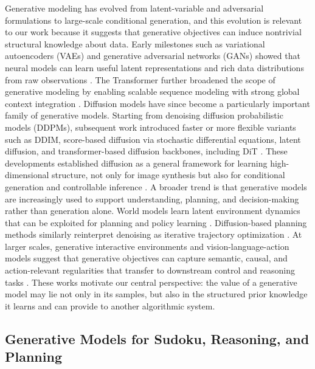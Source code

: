 \documentclass[lettersize,journal]{IEEEtran}
\begin{document}
Generative modeling has evolved from latent-variable and adversarial formulations to large-scale conditional generation, and this evolution is relevant to our work because it suggests that generative objectives can induce nontrivial structural knowledge about data.
Early milestones such as variational autoencoders (VAEs) and generative adversarial networks (GANs) showed that neural models can learn useful latent representations and rich data distributions from raw observations \cite{kingma2013autoencoding,goodfellow2014gan}.
The Transformer further broadened the scope of generative modeling by enabling scalable sequence modeling with strong global context integration \cite{vaswani2017attention}.
Diffusion models have since become a particularly important family of generative models.
Starting from denoising diffusion probabilistic models (DDPMs), subsequent work introduced faster or more flexible variants such as DDIM, score-based diffusion via stochastic differential equations, latent diffusion, and transformer-based diffusion backbones, including DiT \cite{ho2020ddpm,song2020ddim,song2021sde,rombach2022ldm,peebles2023dit}.
These developments established diffusion as a general framework for learning high-dimensional structure, not only for image synthesis but also for conditional generation and controllable inference \cite{han2024ada,han2024mmid}.
A broader trend is that generative models are increasingly used to support understanding, planning, and decision-making rather than generation alone.
World models learn latent environment dynamics that can be exploited for planning and policy learning \cite{ha2018worldmodels,hafner2023dreamerv3}.
Diffusion-based planning methods similarly reinterpret denoising as iterative trajectory optimization \cite{janner2022planning}.
At larger scales, generative interactive environments and vision-language-action models suggest that generative objectives can capture semantic, causal, and action-relevant regularities that transfer to downstream control and reasoning tasks \cite{bruce2024genie,brohan2023rt2}.
These works motivate our central perspective: the value of a generative model may lie not only in its samples, but also in the structured prior knowledge it learns and can provide to another algorithmic system.

\subsection{Generative Models for Sudoku, Reasoning, and Planning}
\end{document}
